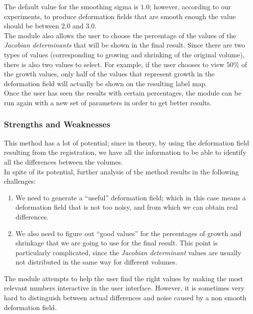 The default value for the smoothing sigma is $1.0$; however, according
to our experiments, to produce deformation fields that are smooth
enough the value should be between $2.0$ and $3.0$.\\

The module also allows the user to choose the percentage of the values
of the \textit{Jacobian determinants} that will be shown in the final
result. Since there are two types of values (corresponding to growing
and shrinking of the original volume), there is also two values to
select. For example, if the user chooses to view $50\%$ of the growth
values, only half of the values that represent growth in the
deformation field will actually be shown on the resulting label map.\\

Once the user has seen the results with certain percentages, the
module can be run again with a new set of parameters in order to get
better results.

\subsubsection{Strengths and Weaknesses}
This method has a lot of potential; since in theory, by using the
deformation field resulting from the registration, we have all the
information to be able to identify all the differences between the
volumes.\\

In spite of its potential, further analysis of the method results in
the following challenges:
\begin{enumerate}
\item We need to generate a ``useful'' deformation field; which in
  this case means a deformation field that is not too noisy, and from
  which we can obtain real differences.
\item We also need to figure out ``good values'' for the percentages
  of growth and shrinkage that we are going to use for the final
  result. This point is particularly complicated, since the
  \textit{Jacobian determinant} values are usually not distributed in
  the same way for different volumes.\\
\end{enumerate}

The module attempts to help the user find the right values by making
the most relevant numbers interactive in the user interface. However,
it is sometimes very hard to distinguish between actual differences
and noise caused by a non smooth deformation field.\\


